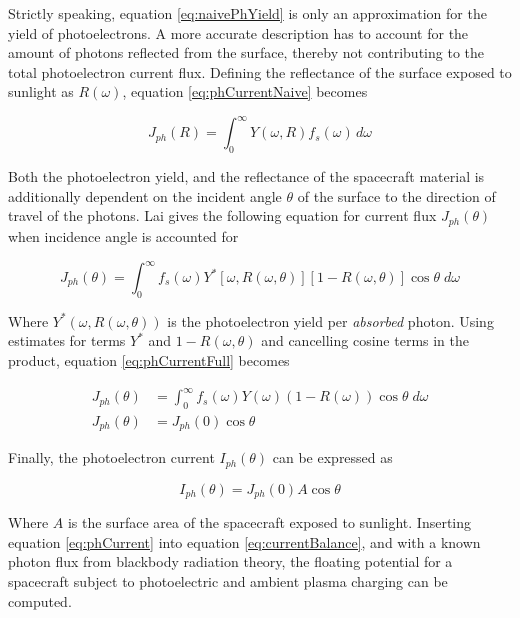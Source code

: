 Strictly speaking, equation \eqref{eq:naivePhYield} is only an approximation for the yield of photoelectrons. A more accurate description has to account for the amount of photons reflected from the surface, thereby not contributing to the total photoelectron current flux. Defining the reflectance of the surface exposed to sunlight as $R(\omega)$, equation \eqref{eq:phCurrentNaive} becomes

\begin{equation}\label{eq:phCurrentR}
    J_{ph}(R) = \int^\infty_0 Y(\omega, R) f_s(\omega) \, d\omega
\end{equation}

Both the photoelectron yield, and the reflectance of the spacecraft material is additionally dependent on the incident angle $\theta$ of the surface to the direction of travel of the photons. Lai gives the following equation for current flux $J_{ph}(\theta)$ when incidence angle is accounted for

\begin{equation}\label{eq:phCurrentFull}
    J_{ph}(\theta) = \int^\infty_0 f_s(\omega) Y^{*}[\omega, R(\omega, \theta)][1 - R(\omega, \theta)] \cos \theta \; d\omega
\end{equation}

Where $Y^{*}(\omega, R(\omega, \theta))$ is the photoelectron yield per \emph{absorbed} photon. Using estimates for terms $Y^{*}$ and $1 - R(\omega, \theta)$ and cancelling cosine terms in the product, equation \eqref{eq:phCurrentFull} becomes

\begin{subequations}
    \begin{align}
        J_{ph}(\theta) &= \int^\infty_0 f_s(\omega) Y(\omega)(1 - R(\omega)) \cos \theta \; d\omega \\
        J_{ph}(\theta) &= J_{ph}(0) \cos \theta
    \end{align}
\end{subequations}


Finally, the photoelectron current $I_{ph}(\theta)$ can be expressed as 

\begin{equation}\label{eq:phCurrent}
    I_{ph}(\theta) = J_{ph}(0) A \cos \theta 
\end{equation}

Where $A$ is the surface area of the spacecraft exposed to sunlight. Inserting equation \eqref{eq:phCurrent} into equation \eqref{eq:currentBalance}, and with a known photon flux from blackbody radiation theory, the floating potential for a spacecraft subject to photoelectric and ambient plasma charging can be computed.

